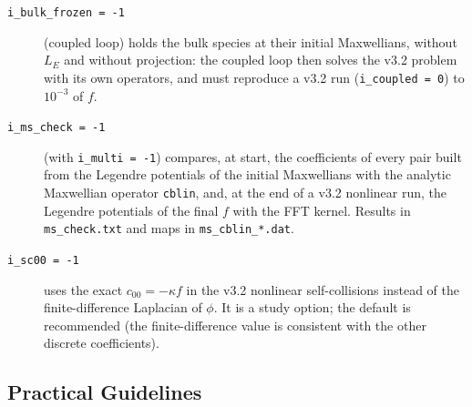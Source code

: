 \documentclass[11pt,a4paper]{article}
\begin{document}
\begin{description}
\item[\texttt{i\_bulk\_frozen = -1}] (coupled loop) holds the bulk species at their initial
  Maxwellians, without $L_E$ and without projection: the coupled loop then solves the v3.2 problem
  with its own operators, and must reproduce a v3.2 run (\texttt{i\_coupled = 0}) to $10^{-3}$ of $f$.
\item[\texttt{i\_ms\_check = -1}] (with \texttt{i\_multi = -1}) compares, at start, the coefficients of
  every pair built from the Legendre potentials of the initial Maxwellians with the analytic
  Maxwellian operator \texttt{cblin}, and, at the end of a v3.2 nonlinear run, the Legendre potentials
  of the final $f$ with the FFT kernel.  Results in \texttt{ms\_check.txt} and maps in
  \texttt{ms\_cblin\_*.dat}.
\item[\texttt{i\_sc00 = -1}] uses the exact $c_{00}=-\kappa f$ in the v3.2 nonlinear self-collisions
  instead of the finite-difference Laplacian of $\phi$.  It is a study option; the default is
  recommended (the finite-difference value is consistent with the other discrete coefficients).
\end{description}

\subsection{Practical Guidelines}
\end{document}
